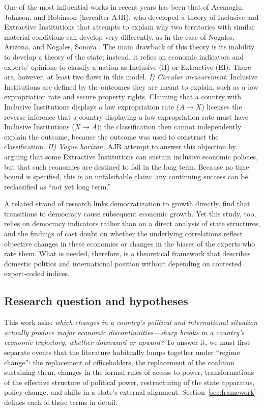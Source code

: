 \documentclass[11pt]{article}
\begin{document}
One of the most influential works in recent years has been that of Acemoglu, Johnson, and Robinson (hereafter AJR), who developed a theory of Inclusive and Extractive Institutions that attempts to explain why two territories with similar material conditions can develop very differently, as in the case of Nogales, Arizona, and Nogales, Sonora \parencite{acemoglu_johnson_robinson_2001,acemoglu_johnson_robinson_2005,acemoglu_robinson_2012}. The main drawback of this theory is its inability to develop a theory of the state; instead, it relies on economic indicators and experts' opinions to classify a nation as Inclusive (II) or Extractive (EI). There are, however, at least two flaws in this model. \textit{I) Circular measurement.} Inclusive Institutions are defined by the outcomes they are meant to explain, such as a low expropriation rate and secure property rights. Claiming that a country with Inclusive Institutions displays a low expropriation rate ($A \to X$) licenses the reverse inference that a country displaying a low expropriation rate must have Inclusive Institutions ($X \to A$); the classification then cannot independently explain the outcome, because the outcome was used to construct the classification. \textit{II) Vague horizon.} AJR attempt to answer this objection by arguing that some Extractive Institutions can sustain inclusive economic policies, but that such economies are destined to fail in the long term. Because no time bound is specified, this is an unfalsifiable claim: any continuing success can be reclassified as ``not yet long term.''

A related strand of research links democratization to growth directly. \textcite{acemoglu_naidu_restrepo_robinson_2019} find that transitions to democracy cause subsequent economic growth. Yet this study, too, relies on democracy indicators rather than on a direct analysis of state structures, and the findings of \textcite{little_meng_2024} cast doubt on whether the underlying correlations reflect objective changes in these economies or changes in the biases of the experts who rate them. What is needed, therefore, is a theoretical framework that describes domestic politics and international position without depending on contested expert-coded indices.

\subsection{Research question and hypotheses}

This work asks: \emph{which changes in a country's political and international situation actually produce major economic discontinuities---sharp breaks in a country's economic trajectory, whether downward or upward?} To answer it, we must first separate events that the literature habitually lumps together under ``regime change'': the replacement of officeholders, the replacement of the coalition sustaining them, changes in the formal rules of access to power, transformations of the effective structure of political power, restructuring of the state apparatus, policy change, and shifts in a state's external alignment. Section~\ref{sec:framework} defines each of these terms in detail.
\end{document}

